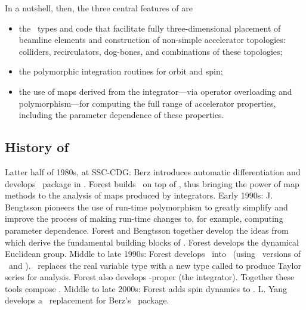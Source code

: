 %
In a nutshell, then, the three central features of \PTC%
 are
\begin{itemize}
  \item the \Fninety\ types and code that facilitate fully three-dimensional
        placement of beamline elements and construction of non-simple
        accelerator topologies: colliders, recirculators, dog-bones,
        and combinations of these topologies;
  \item the polymorphic integration routines for orbit and spin;
  \item the use of maps derived from the integrator---via operator
        overloading and polymorphism---for computing the full range
        of accelerator properties, including the parameter dependence
        of these properties.
\end{itemize}

\subsection{History of \PTC}

Latter half of 1980s, at SSC-CDG: Berz introduces automatic
differentiation and develops \DA\ package in \Fsevens.
Forest builds \LieLib\ on top of \DA, thus bringing the power
of map methods to the analysis of maps produced by integrators.
Early 1990s: J. Bengtsson pioneers the use of run-time polymorphism
to greatly simplify and improve the process of making run-time
changes to, for example, computing parameter dependence.
Forest and Bengtsson together develop the ideas from which derive
the fundamental building blocks of \PTC. Forest develops the
dynamical Euclidean group.
Middle to late 1990s: Forest develops \LieLib\ into \FPP\
(using \LBNL\ versions of \DA\ and \LieLib).
\FPP\ replaces the real variable type  with a new type
called \ptc{real\_8} to produce Taylor series for analysis.
Forest also develops \PTC-proper (the integrator).
Together these tools compose \PTC.
Middle to late 2000s: Forest adds spin dynamics to \PTC.
L. Yang develops a \Cpp\ replacement for Berz's \DA\ package.

